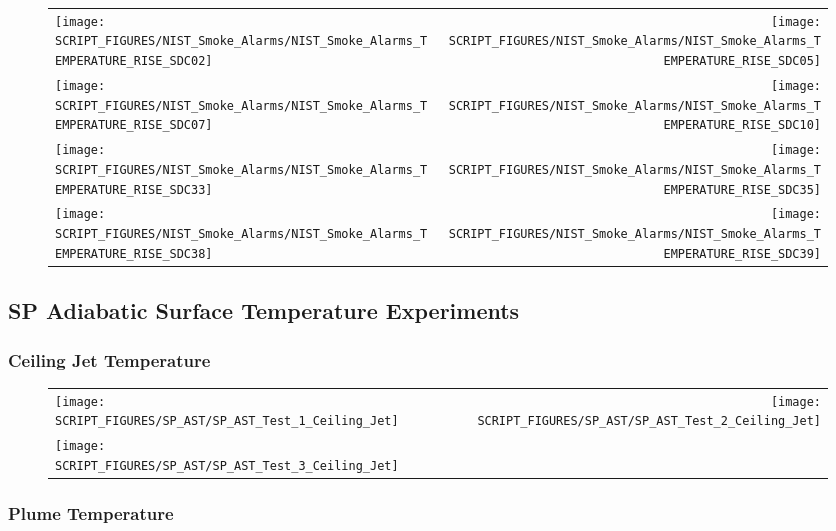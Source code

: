 \begin{figure}[!ht]
\begin{tabular*}{\textwidth}{l@{\extracolsep{\fill}}r}
\texttt{[image: SCRIPT\_FIGURES/NIST\_Smoke\_Alarms/NIST\_Smoke\_Alarms\_TEMPERATURE\_RISE\_SDC02]} &
\texttt{[image: SCRIPT\_FIGURES/NIST\_Smoke\_Alarms/NIST\_Smoke\_Alarms\_TEMPERATURE\_RISE\_SDC05]} \\
\texttt{[image: SCRIPT\_FIGURES/NIST\_Smoke\_Alarms/NIST\_Smoke\_Alarms\_TEMPERATURE\_RISE\_SDC07]} &
\texttt{[image: SCRIPT\_FIGURES/NIST\_Smoke\_Alarms/NIST\_Smoke\_Alarms\_TEMPERATURE\_RISE\_SDC10]} \\
\texttt{[image: SCRIPT\_FIGURES/NIST\_Smoke\_Alarms/NIST\_Smoke\_Alarms\_TEMPERATURE\_RISE\_SDC33]} &
\texttt{[image: SCRIPT\_FIGURES/NIST\_Smoke\_Alarms/NIST\_Smoke\_Alarms\_TEMPERATURE\_RISE\_SDC35]} \\
\texttt{[image: SCRIPT\_FIGURES/NIST\_Smoke\_Alarms/NIST\_Smoke\_Alarms\_TEMPERATURE\_RISE\_SDC38]} &
\texttt{[image: SCRIPT\_FIGURES/NIST\_Smoke\_Alarms/NIST\_Smoke\_Alarms\_TEMPERATURE\_RISE\_SDC39]}
\end{tabular*}
\end{figure}

\clearpage

\subsection{SP Adiabatic Surface Temperature Experiments}

\subsubsection{Ceiling Jet Temperature}

\begin{figure}[!ht]
\begin{tabular*}{\textwidth}{l@{\extracolsep{\fill}}r}
\texttt{[image: SCRIPT\_FIGURES/SP\_AST/SP\_AST\_Test\_1\_Ceiling\_Jet]} &
\texttt{[image: SCRIPT\_FIGURES/SP\_AST/SP\_AST\_Test\_2\_Ceiling\_Jet]} \\
\texttt{[image: SCRIPT\_FIGURES/SP\_AST/SP\_AST\_Test\_3\_Ceiling\_Jet]}
\end{tabular*}
\end{figure}

\clearpage

\subsubsection{Plume Temperature}

